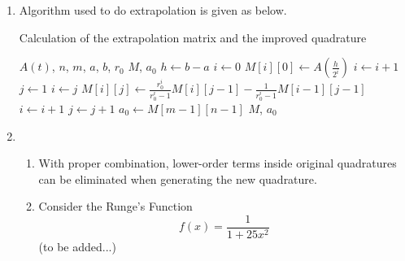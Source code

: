 \documentclass[paper=a4, fontsize=11pt]{scrartcl} %
\numberwithin{equation}{section} %
\numberwithin{figure}{section} %
\numberwithin{table}{section} %
\begin{document}
\begin{enumerate}
\begin{enumerate}
		\end{enumerate}
	\item
		Algorithm used to do extrapolation is given as below.
		
		\begin{algorithm}
		\caption{Calculation of the extrapolation matrix and the improved quadrature}
			\begin{algorithmic}[1]
				\REQUIRE $A(t)$, $n$, $m$, $a$, $b$, $r_0$
				\ENSURE $M$, $a_0$
				\STATE $h \gets b-a$
				\STATE $i \gets 0$
					\STATE $M[i][0] \gets A(\frac{h}{2^i})$
					\STATE $i \gets i + 1$
				\ENDWHILE
				\STATE $j \gets 1$
					\STATE $i \gets j$
						\STATE $M[i][j] \gets \frac{r_0^i}{r_0^i - 1} M[i][j-1] - \frac{1}{r_0^i -1} M[i-1][j-1]$
						\STATE $i \gets i+1$
					\ENDWHILE
					\STATE $j \gets j+1$
				\ENDWHILE
				\STATE $a_0 \gets M[m-1][n-1]$
				\RETURN $M$, $a_0$
			\end{algorithmic}
		\end{algorithm}
	
	\item
		\begin{enumerate}
			\item 
				With proper combination, lower-order terms inside original quadratures can be eliminated when generating the new quadrature.
			\item 
				Consider the Runge's Function
				\begin{equation}
					f(x) = \frac{1}{1+25x^2}
				\end{equation}
				(to be added...)
		\end{enumerate}
	
\end{enumerate}


\end{document}
